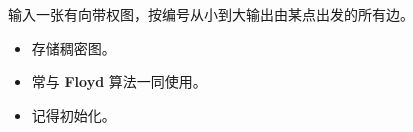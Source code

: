\noindent 输入一张有向带权图，按编号从小到大输出由某点出发的所有边。

\begin{itemize}
    \item 存储稠密图。
    \item 常与 \textbf{Floyd} 算法一同使用。
    \item 记得初始化。
\end{itemize}